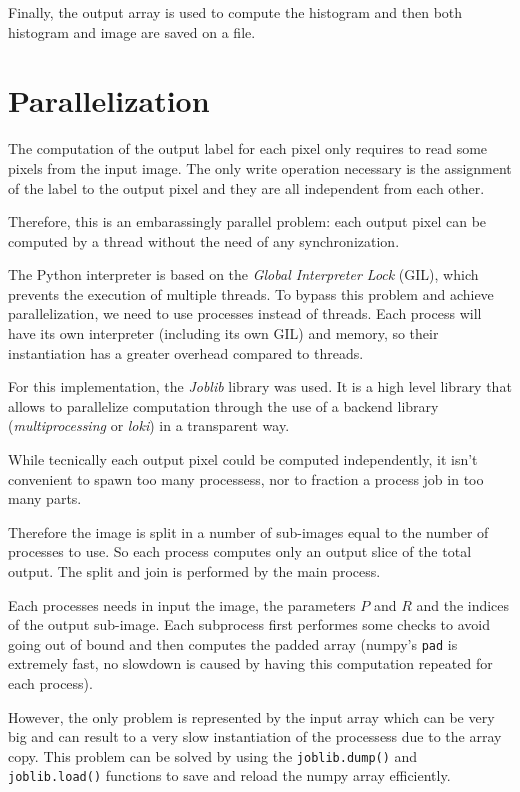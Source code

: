 \documentclass[10pt,twocolumn,letterpaper]{article}
\begin{document}
Finally, the output array is used to compute the histogram and then both histogram and image are saved on a file. 

\section{Parallelization}

The computation of the output label for each pixel only requires to read some pixels from the input image. The only write operation necessary is the assignment of the label to the output pixel and they are all independent from each other. 

Therefore, this is an embarassingly parallel problem: each output pixel can be computed by a thread without the need of any synchronization.

The Python interpreter is based on the \textit{Global Interpreter Lock} (GIL), which prevents the execution of multiple threads. To bypass this problem and achieve parallelization, we need to use processes instead of threads.
Each process will have its own interpreter (including its own GIL) and  memory, so their instantiation has a greater overhead compared to threads.

For this implementation, the \textit{Joblib} library was used. It is a high level library that allows to parallelize computation through the use of a backend library (\textit{multiprocessing} or \textit{loki}) in a transparent way.

While tecnically each output pixel could be computed independently, it isn't convenient to spawn too many processess, nor to fraction a process job in too many parts. 

Therefore the image is split in a number of sub-images equal to the number of processes to use. So each process computes only an output slice of the total output. The split and join is performed by the main process.

Each processes needs in input the image, the parameters $P$ and $R$ and the indices of the output sub-image. Each subprocess first performes some checks to avoid going out of bound and then computes the padded array (numpy's \verb"pad" is extremely fast, no slowdown is caused by having this computation repeated for each process).

However, the only problem is represented by the input array which can be very big and can result to a very slow instantiation of the processess due to the array copy. This problem can be solved by using the \verb"joblib.dump()" and \verb"joblib.load()" functions to save and reload the numpy array efficiently. 
\end{document}
